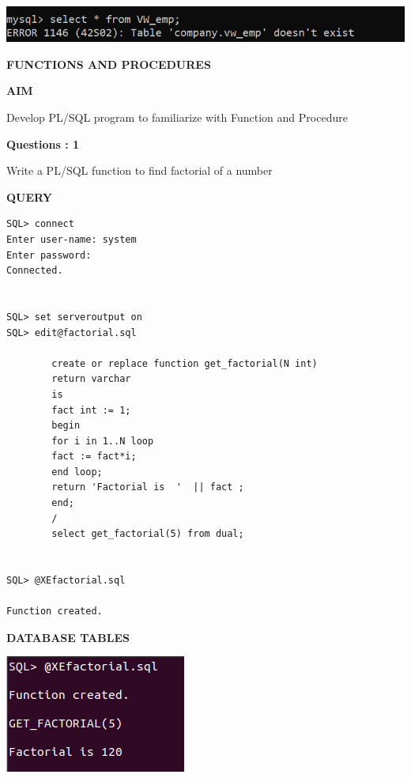 \documentclass[a4paper,12pt]{report}
\begin{document}
\includegraphics[scale=1]{vwdrop.png}
\newpage
\begin{center}
		\large\textbf{FUNCTIONS AND PROCEDURES}
	\end{center}
	
	\begin{flushleft}
		\textbf{AIM }
	\end{flushleft} 
	   Develop PL/SQL program to familiarize with Function and Procedure

\begin{flushleft}
    \textbf{Questions : 1}
\end{flushleft}
Write a PL/SQL function to find factorial of a number
	\begin{flushleft}
		\textbf{QUERY }
	\end{flushleft}
 \begin{verbatim}
SQL> connect
Enter user-name: system
Enter password:
Connected.


SQL> set serveroutput on
SQL> edit@factorial.sql

		create or replace function get_factorial(N int)
		return varchar
		is
		fact int := 1;
		begin
		for i in 1..N loop
		fact := fact*i;
		end loop;
		return 'Factorial is  '  || fact ;
		end;
		/
		select get_factorial(5) from dual;


SQL> @XEfactorial.sql

Function created.

\end{verbatim}
\begin{flushleft}
		\textbf{DATABASE TABLES} 
\end{flushleft} 

\includegraphics[scale=0.7]{FACTORIAL.png}
\end{document}
